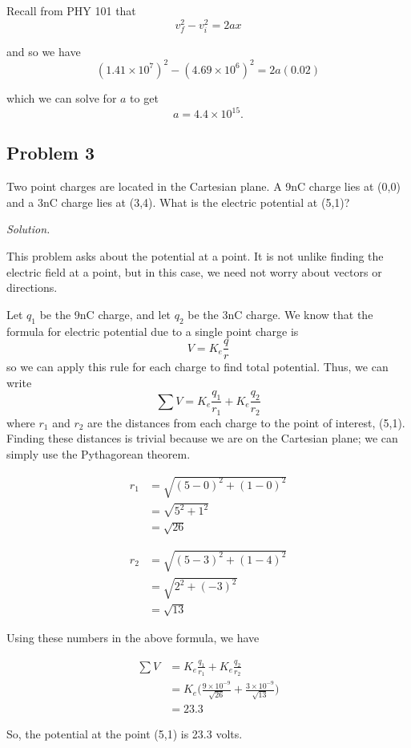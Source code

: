 \documentclass{article}
\begin{document}
	Recall from PHY 101 that
	$$ v_f^2 - v_i^2 = 2ax $$
	
	and so we have
	$$ (1.41 \times 10^{7})^2 - (4.69 \times 10^{6})^2 = 2a(0.02) $$
	
	which we can solve for $a$ to get
	$$ a = 4.4 \times 10^{15} . $$
		
		
	\subsection{Problem 3}
	
	Two point charges are located in the Cartesian plane. A 9nC charge lies at (0,0) and a 3nC charge lies at (3,4). What is the electric potential at (5,1)?
	
	\textit{Solution.}
	
	This problem asks about the potential at a point. It is not unlike finding the electric field at a point, but in this case, we need not worry about vectors or directions.
	
	Let $q_1$ be the 9nC charge, and let $q_2$ be the 3nC charge. We know that the formula for electric potential due to a single point charge is
	$$ V = K_e \frac{q}{r} $$
	so we can apply this rule for each charge to find total potential. Thus, we can write
	$$ \sum V =  K_e \frac{q_1}{r_1} + K_e \frac{q_2}{r_2} $$
	where $r_1$ and $r_2$ are the distances from each charge to the point of interest, (5,1). Finding these distances is trivial because we are on the Cartesian plane; we can simply use the Pythagorean theorem.
	
	\begin{equation*}
	\begin{split}
	r_1 & = \sqrt{(5-0)^2 + (1-0) ^2} \\
	    & = \sqrt{5^2 + 1^2} \\
	    & = \sqrt{26}
	\end{split}
	\end{equation*}
	
	\begin{equation*}
	\begin{split}
	r_2 & = \sqrt{(5-3)^2 + (1-4) ^2} \\
	    & = \sqrt{2^2 + (-3)^2} \\
	    & = \sqrt{13}
	\end{split}
	\end{equation*}	
	
	Using these numbers in the above formula, we have
	
	\begin{equation*}
	\begin{split}
	\sum V & = K_e \frac{q_1}{r_1} + K_e \frac{q_2}{r_2} \\
	& = K_e \Big( \frac{9 \times 10^{-9}}{\sqrt{26}} + \frac{3 \times 10^{-9}}{\sqrt{13}} \Big) \\
	& = 23.3
	\end{split}
	\end{equation*}
	
	So, the potential at the point (5,1) is 23.3 volts.
		
	
	
	
	
	
\end{document}
